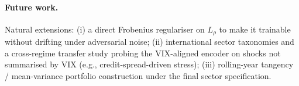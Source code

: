 \paragraph{Future work.}
Natural extensions: (i) a direct Frobenius regulariser on $L_\rho$ to make it trainable without drifting under adversarial noise; (ii) international sector taxonomies and a cross-regime transfer study probing the VIX-aligned encoder on shocks not summarised by VIX (e.g., credit-spread-driven stress); (iii) rolling-year tangency / mean-variance portfolio construction under the final sector specification.

